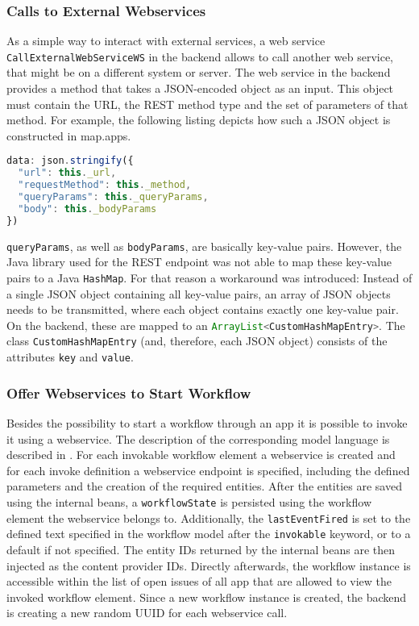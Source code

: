\subsubsection{Calls to External Webservices}
As a simple way to interact with external services, a web service \lstinline|CallExternalWebServiceWS| in the backend allows to call another web service, that might be on a different system or server. The web service in the backend provides a method that takes a JSON-encoded object as an input. This object must contain the URL, the REST method type and the set of parameters of that method. For example, the following listing depicts how such a JSON object is constructed in map.apps.


\begin{lstlisting}[language=Javascript, label=lst:callExtWSJSON, caption=JSON-encoded object containing information to call an external web service]
data: json.stringify({
  "url": this._url,
  "requestMethod": this._method,
  "queryParams": this._queryParams,
  "body": this._bodyParams
})
\end{lstlisting}

\lstinline|queryParams|, as well as \lstinline|bodyParams|, are basically key-value pairs. However, the Java library used for the REST endpoint was not able to map these key-value pairs to a Java \lstinline|HashMap|. For that reason a workaround was introduced: Instead of a single JSON object containing all key-value pairs, an array of JSON objects needs to be transmitted, where each object contains exactly one key-value pair. On the backend, these are mapped to an \lstinline[language=Java]|ArrayList<CustomHashMapEntry>|. The class \lstinline|CustomHashMapEntry| (and, therefore, each JSON object) consists of the attributes \lstinline[language=Simple]|key| and  \lstinline[language=Simple]|value|.

\subsubsection{Offer Webservices to Start Workflow}
Besides the possibility to start a workflow through an app it is possible to invoke it using a webservice. The description of the corresponding model language is described in . For each invokable workflow element a webservice is created and for each invoke definition a webservice endpoint is specified, including the defined parameters and the creation of the required entities. After the entities are saved using the internal beans, a \lstinline|workflowState| is persisted using the workflow element the webservice belongs to. Additionally, the \lstinline|lastEventFired| is set to the defined text specified in the workflow model after the \lstinline[language=MD2]|invokable| keyword, or to a default if not specified. The entity IDs returned by the internal beans are then injected as the content provider IDs. Directly afterwards, the workflow instance is accessible within the list of open issues of all app that are allowed to view the invoked workflow element. Since a new workflow instance is created, the backend is creating a new random UUID for each webservice call.

